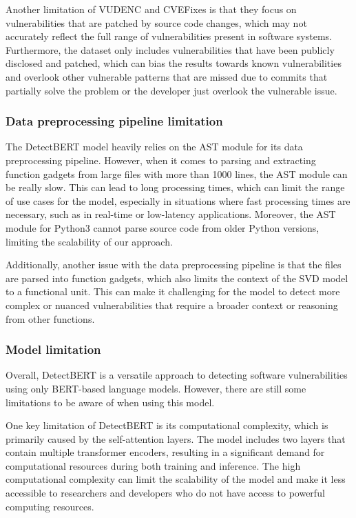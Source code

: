 \documentclass{ieeeaccess}
\begin{document}
\par Another limitation of VUDENC and CVEFixes is that they focus on vulnerabilities that are patched by source code changes, which may not accurately reflect the full range of vulnerabilities present in software systems. Furthermore, the dataset only includes vulnerabilities that have been publicly disclosed and patched, which can bias the results towards known vulnerabilities and overlook other vulnerable patterns that are missed due to commits that partially solve the problem or the developer just overlook the vulnerable issue.

\subsubsection{Data preprocessing pipeline limitation}

\par The DetectBERT model heavily relies on the AST module for its data preprocessing pipeline. However, when it comes to parsing and extracting function gadgets from large files with more than 1000 lines, the AST module can be really slow. This can lead to long processing times, which can limit the range of use cases for the model, especially in situations where fast processing times are necessary, such as in real-time or low-latency applications. Moreover, the AST module for Python3 cannot parse source code from older Python versions, limiting the scalability of our approach. 
\par Additionally, another issue with the data preprocessing pipeline is that the files are parsed into function gadgets, which also limits the context of the SVD model to a functional unit. This can make it challenging for the model to detect more complex or nuanced vulnerabilities that require a broader context or reasoning from other functions.

\subsubsection{Model limitation}
\par Overall, DetectBERT is a versatile approach to detecting software vulnerabilities using only BERT-based language models. However, there are still some limitations to be aware of when using this model.

\par  One key limitation of DetectBERT is its computational complexity, which is primarily caused by the self-attention layers. The model includes two layers that contain multiple transformer encoders, resulting in a significant demand for computational resources during both training and inference. The high computational complexity can limit the scalability of the model and make it less accessible to researchers and developers who do not have access to powerful computing resources.
\end{document}
